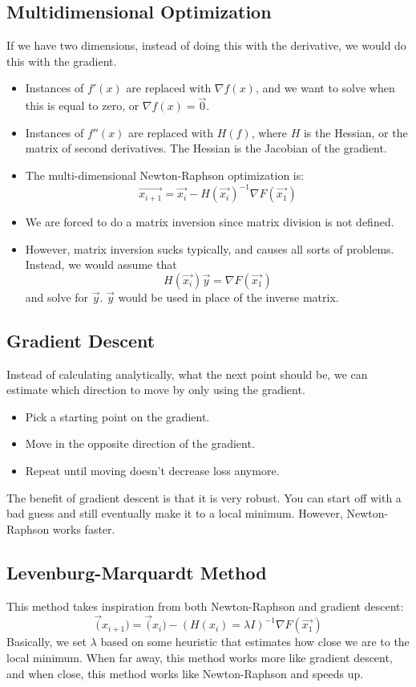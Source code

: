 \documentclass[10pt]{article}
\begin{document}
\subsection*{Multidimensional Optimization}
If we have two dimensions, instead of doing this with the derivative, we would do this with the gradient.  
\begin{itemize}
	\item Instances of $f'(x)$ are replaced with $\nabla f(x)$, and we want to solve when this is equal to zero, or $\nabla f(x) = \vec{0}$.
	\item Instances of $f''(x)$ are replaced with $H(f)$, where $H$ is the Hessian, or the matrix of second derivatives.  The Hessian is the Jacobian of the gradient.
	\item The multi-dimensional Newton-Raphson optimization is:
	\[\vec{x_{i + 1}} = \vec{x_i} - H(\vec{x_i})^{-1} \nabla F(\vec{x_1})\]
    \item We are forced to do a matrix inversion since matrix division is not defined.
    \item However, matrix inversion sucks typically, and causes all sorts of problems.  Instead, we would assume that
    \[H(\vec{x_i}) \vec{y} = \nabla F(\vec{x_1})\]
    and solve for $\vec{y}$.  $\vec{y}$ would be used in place of the inverse matrix.
\end{itemize}

\subsection*{Gradient Descent}
Instead of calculating analytically, what the next point should be, we can estimate which direction to move by only using the gradient.
\begin{itemize}
	\item Pick a starting point on the gradient.
	\item Move in the opposite direction of the gradient.
	\item Repeat until moving doesn't decrease loss anymore.
\end{itemize}
The benefit of gradient descent is that it is very robust.  You can start off with a bad guess and still eventually make it to a local minimum.  However, Newton-Raphson works faster.

\subsection*{Levenburg-Marquardt Method}
This method takes inspiration from both Newton-Raphson and gradient descent:
\[\vec(x_{i + 1}) = \vec(x_i) - (H(x_i) = \lambda I)^{-1} \nabla F(\vec{x_1})\]
Basically, we set $\lambda$ based on some heuristic that estimates how close we are to the local minimum.  When far away, this method works more like gradient descent, and when close, this method works like Newton-Raphson and speeds up.
\end{document}
